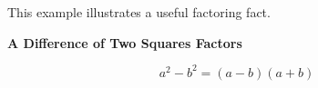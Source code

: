 \documentclass{ximera}
\begin{document}
This example illustrates a useful factoring fact.



\begin{fact} \textbf{\textcolor{purple!85!blue}{A Difference of Two Squares Factors}}

\[
a^2 - b^2 = (a-b)(a+b)
\]

\end{fact}
\end{document}
